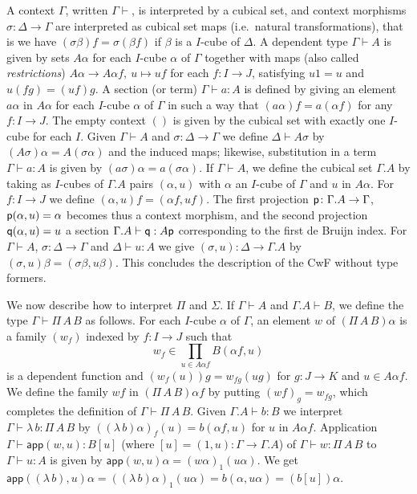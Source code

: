 \documentclass[a4paper,USenglish,draft]{lipics}
\newcommand{\app}{\mathsf{app}}
\newcommand{\pp}{{\sf p}}
\newcommand{\qq}{{\sf q}}
\begin{document}
A context $\Gamma$, written $\Gamma \vdash$, is interpreted by a
cubical set, and context morphisms $\sigma:\Delta\to\Gamma$ are
interpreted as cubical set maps (i.e.\ natural transformations), that
is we have $(\sigma\beta)f = \sigma(\beta f)$ if $\beta$ is a $I$-cube
of $\Delta$.  A dependent type $\Gamma\vdash A$ is given by sets
$A\alpha$ for each $I$-cube $\alpha$ of $\Gamma$ together with maps
(also called \emph{restrictions}) $A\alpha\to A\alpha f,~u\longmapsto
uf$ for each $f \colon I \to J$, satisfying $u1 = u$ and $u(fg) =
(uf)g$.  A section (or term) $\Gamma\vdash a:A$ is defined by giving
an element $a\alpha$ in $A\alpha$ for each $I$-cube $\alpha$ of
$\Gamma$ in such a way that $(a\alpha) f = a (\alpha f)$ for any $f
\colon I \to J$.  The empty context $()$ is given by the cubical set
with exactly one $I$-cube for each $I$.  Given $\Gamma \vdash A$ and
$\sigma \colon \Delta \to \Gamma$ we define $\Delta \vdash A \sigma$
by $(A \sigma) \alpha = A (\sigma \alpha)$ and the induced maps;
likewise, substitution in a term $\Gamma \vdash a : A$ is given by $(a
\sigma) \alpha = a (\sigma \alpha)$.  If $\Gamma\vdash A$, we define
the cubical set $\Gamma.A$ by taking as $I$-cubes of $\Gamma.A$ pairs
$(\alpha,u)$ with $\alpha$ an $I$-cube of $\Gamma$ and $u$ in
$A\alpha$. For $f:I\to J$ we define $(\alpha,u)f = (\alpha f,u f)$.
The first projection $\pp \colon \Gamma.A \to \Gamma$, $\pp (\alpha,
u) = \alpha$ becomes thus a context morphism, and the second
projection $\qq (\alpha, u) = u$ a section $\Gamma.A \vdash \qq : A
\pp$ corresponding to the first de Bruijn index.  For $\Gamma \vdash
A$, $\sigma \colon \Delta \to \Gamma$ and $\Delta \vdash u : A$ we
give $(\sigma, u) \colon \Delta \to \Gamma.A$ by $(\sigma, u) \beta =
(\sigma \beta, u \beta)$.  This concludes the description of the CwF
without type formers.

We now describe how to interpret $\Pi$ and $\Sigma$. If $\Gamma\vdash
A$ and $\Gamma.A\vdash B$, we define the type $\Gamma\vdash \Pi\,A\,B$
as follows.  For each $I$-cube $\alpha$ of $\Gamma$, an element $w$ of
$(\Pi\,A\,B)\alpha$ is a family $(w_f)$ indexed by $f:I\to J$ such
that
\[
w_f \in \prod_{u \in A \alpha f} B (\alpha f, u)
\]
is a dependent function and $(w_f (u)) g = w_{fg} (u g)$ for $g \colon
J \to K$ and $u \in A \alpha f$.  We define the family $wf$ in
$(\Pi\,A\,B) \alpha f$ by putting $(wf)_g = w_{fg}$, which completes
the definition of $\Gamma\vdash \Pi\,A\,B$.  Given $\Gamma.A \vdash b
: B$ we interpret $\Gamma \vdash \lambda\,b : \Pi\,A\,B$ by $
((\lambda\, b) \alpha)_f (u) = b (\alpha f, u)$ for $u$ in $A \alpha
f$.  Application $\Gamma \vdash \app (w,u) : B [u]$ (where $[u] = (1,
u) \colon \Gamma \to \Gamma.A$) of $\Gamma \vdash w : \Pi\,A\,B$ to
$\Gamma \vdash u : A$ is given by $\app (w, u) \alpha = (w\alpha)_1
(u\alpha)$.  We get $\app ((\lambda\,b), u) \alpha = ((\lambda\,b)
\alpha)_1 (u \alpha) = b (\alpha, u\alpha) = (b [u]) \alpha$.
\end{document}

